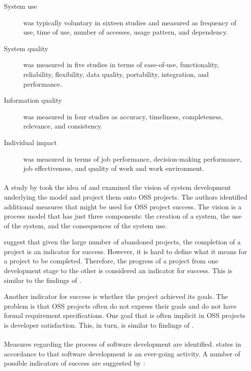 \begin{description}
	\item[System use] was typically voluntary in sixteen studies and measured as
		frequency of use, time of use, number of accesses, usage pattern, and
		dependency.

	\item[System quality] was measured in five studies in terms of ease-of-use,
		functionality, reliability, flexibility, data quality, portability,
		integration, and performance.

	\item[Information quality] was measured in four studies as accuracy,
		timeliness, completeness, relevance, and consistency.

	\item[Individual impact] was measured in terms of job performance,
		decision-making performance, job effectiveness, and quality of work and work
		environment.
\end{description}

\paragraph{}
A study by \citet{crowston2003} took the idea of \citeauthor{delone2003}
\cite{delone1992, delone2003} and examined the vision of system development
underlying the model and project them onto OSS projects. The authors identified
additional measures that might be used for OSS project success. The vision is a
process model that has just three components: the creation of a system, the use
of the system, and the consequences of the system use.

\citet{crowston2003} suggest that given the large number of abandoned projects,
the completion of a project is an indicator for success. However, it is hard to
define what it means for a project to be completed. Therefore, the progress of
a project from one development stage to the other is considered an indicator for
success. This is similar to the findings of \citet{androutsellis}.

Another indicator for success is whether the project achieved its goals. The
problem is that OSS projects often do not express their goals and do not have
formal requirement specifications. One goal that is often implicit in OSS
projects is developer satisfaction. This, in turn, is similar to findings of
\citet{androutsellis}.

\paragraph{}
Measures regarding the process of software development are identified.
\citet{crowston2003} states in accordance to \citet{lehman} that
software development is an ever-going activity. A number of possible indicators
of success are suggested by \citeauthor{crowston2003}:

